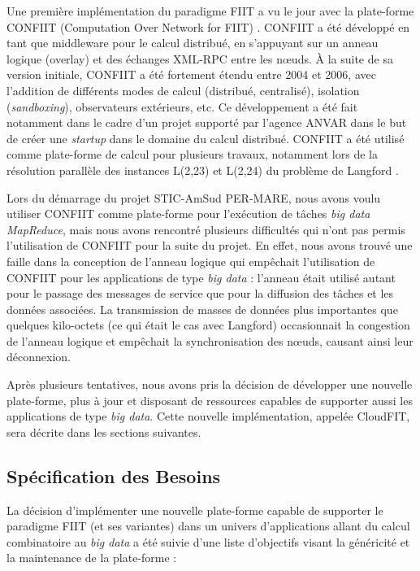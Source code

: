 Une première implémentation du paradigme FIIT a vu le jour avec la plate-forme CONFIIT (Computation Over Network for FIIT) \cite{FKF03,Flauzac10}. CONFIIT a été développé en tant que middleware pour le calcul distribué, en s'appuyant sur un anneau logique (overlay) et des échanges XML-RPC entre les n{\oe}uds. À la suite de sa version initiale, CONFIIT a été fortement étendu entre 2004 et 2006, avec l'addition de différents modes de calcul (distribué, centralisé), isolation (\textit{sandboxing}), observateurs extérieurs, etc. Ce développement a été fait notamment dans le cadre d'un projet supporté par l'agence ANVAR dans le but de créer une \textit{startup} dans le domaine du calcul distribué.
CONFIIT a été utilisé comme plate-forme de calcul pour plusieurs travaux, notamment lors de la résolution parallèle des instances L(2,23) et L(2,24) du problème de Langford \cite{JK04}.

Lors du démarrage du projet STIC-AmSud PER-MARE, nous avons voulu utiliser CONFIIT comme plate-forme pour l'exécution de tâches \textit{big data} \textit{MapReduce}, mais nous avons rencontré plusieurs difficultés qui n'ont pas permis l'utilisation de CONFIIT pour la suite du projet. En effet, nous avons trouvé une faille dans la conception de l'anneau logique qui empêchait l'utilisation de CONFIIT pour les applications de type \textit{big data} : l'anneau était utilisé autant pour le passage des messages de service que pour la diffusion des tâches et les données associées. La transmission de masses de données plus importantes que quelques kilo-octets (ce qui était le cas avec Langford) occasionnait la congestion de l'anneau logique et empêchait la synchronisation des n{\oe}uds, causant ainsi leur déconnexion.

Après plusieurs tentatives, nous avons pris la décision de développer une nouvelle plate-forme, plus à jour et disposant de ressources capables de supporter aussi les applications de type \textit{big data}. Cette nouvelle implémentation, appelée CloudFIT, sera décrite dans les sections suivantes. 


\subsection{Spécification des Besoins}

La décision d'implémenter une nouvelle plate-forme capable de supporter le paradigme FIIT (et ses variantes) dans un univers d'applications allant du calcul combinatoire au \textit{big data} a été suivie d'une liste d'objectifs visant la généricité et la maintenance de la plate-forme :

